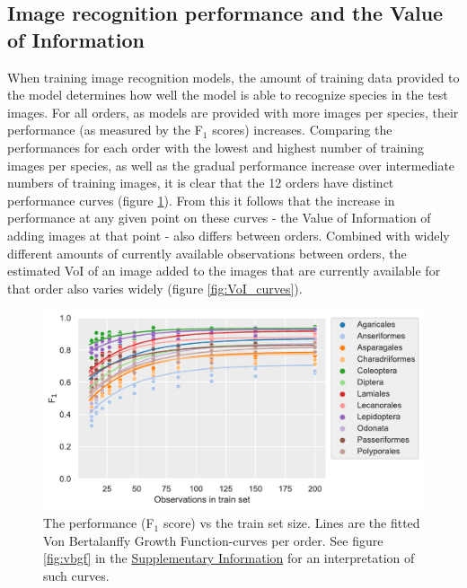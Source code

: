 \documentclass{article}
\begin{document}
\subsection*{Image recognition performance and the Value of Information}
When training image recognition models, the amount of training data provided to the model determines how well the model is able to recognize species in the test images. For all orders, as models are provided with more images per species, their performance (as measured by the F\(_1\) scores) increases. Comparing the performances for each order with the lowest and highest number of training images per species, as well as the gradual performance increase over intermediate numbers of training images, it is clear that the 12 orders have distinct performance curves (figure \ref{fig:F1_curves}). From this it follows that the increase in performance at any given point on these curves - the Value of Information of adding images at that point - also differs between orders. Combined with widely different amounts of currently available observations between orders, the estimated VoI of an image added to the images that are currently available for that order also varies widely (figure \ref{fig:VoI_curves}).


\begin{figure}[!ht]
  \includegraphics[width=\textwidth]{2}
  \caption{\footnotesize The performance (F\(_1\) score) vs the train set size. Lines are the fitted Von Bertalanffy Growth Function-curves per order. See figure \ref{fig:vbgf} in the \hyperref[fig:vbgf]{Supplementary Information} for an interpretation of such curves.
  }
  \label{fig:F1_curves}
\end{figure}
\end{document}

